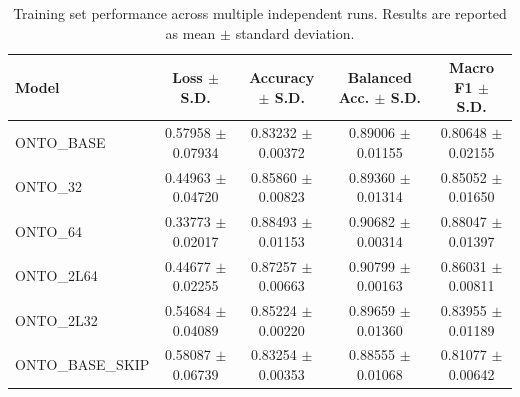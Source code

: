 \begin{table}[t]
\centering
\begin{tabular}{l c c c c}
\toprule
Model & Loss $\pm$ S.D. & Accuracy $\pm$ S.D. & Balanced Acc. $\pm$ S.D. & Macro F1 $\pm$ S.D. \\
\midrule
ONTO_BASE & 0.57958 $\pm$ 0.07934 & 0.83232 $\pm$ 0.00372 & 0.89006 $\pm$ 0.01155 & 0.80648 $\pm$ 0.02155 \\
ONTO_32 & 0.44963 $\pm$ 0.04720 & 0.85860 $\pm$ 0.00823 & 0.89360 $\pm$ 0.01314 & 0.85052 $\pm$ 0.01650 \\
ONTO_64 & 0.33773 $\pm$ 0.02017 & 0.88493 $\pm$ 0.01153 & 0.90682 $\pm$ 0.00314 & 0.88047 $\pm$ 0.01397 \\
ONTO_2L64 & 0.44677 $\pm$ 0.02255 & 0.87257 $\pm$ 0.00663 & 0.90799 $\pm$ 0.00163 & 0.86031 $\pm$ 0.00811 \\
ONTO_2L32 & 0.54684 $\pm$ 0.04089 & 0.85224 $\pm$ 0.00220 & 0.89659 $\pm$ 0.01360 & 0.83955 $\pm$ 0.01189 \\
ONTO_BASE_SKIP & 0.58087 $\pm$ 0.06739 & 0.83254 $\pm$ 0.00353 & 0.88555 $\pm$ 0.01068 & 0.81077 $\pm$ 0.00642 \\
\bottomrule
\end{tabular}
\caption{Training set performance across multiple independent runs. Results are reported as mean $\pm$ standard deviation.}
\label{tab:training_rn_results}
\end{table}